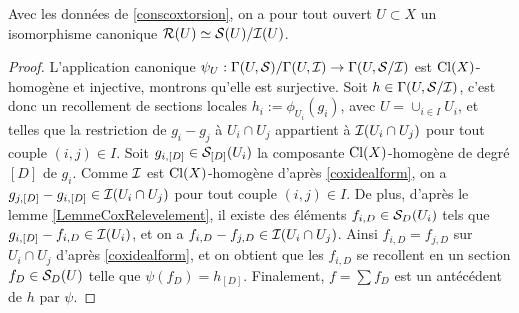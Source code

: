 \begin{prop}\label{coxsheafiso}
Avec les données de \ref{conscoxtorsion}, on a pour tout ouvert $U\subset X$ un isomorphisme canonique $\mathcal{R}(U)\simeq \mathcal{S}(U)/\mathcal{I}(U)$.
\end{prop}
\begin{proof}
L'application canonique $\psi_U:\Gamma(U,\mathcal{S})/\Gamma(U,\mathcal{I})\rightarrow\Gamma(U,\mathcal{S}/\mathcal{I})$ est $\operatorname{Cl}(X)$-homogène et injective, montrons qu'elle est surjective. Soit $h\in\Gamma(U,\mathcal{S}/\mathcal{I})$, c'est donc un recollement de sections locales $h_i:=\phi_{U_i}(g_i)$, avec $U=\cup_{i\in I}U_i$, et telles que la restriction de $g_i-g_j$ à $U_i\cap U_j$ appartient à $\mathcal{I}(U_i\cap U_j)$ pour tout couple $(i,j)\in I$. Soit $g_{i,[D]}\in \mathcal{S}_{[D]}(U_i)$ la composante $\operatorname{Cl}(X)$-homogène de degré $[D]$ de $g_i$. Comme $\mathcal{I}$ est $\operatorname{Cl}(X)$-homogène d'après \ref{coxidealform}, on a $g_{j,[D]}-g_{i,[D]}\in\mathcal{I}(U_i\cap U_j)$ pour tout couple $(i,j)\in I$. De plus, d'après le lemme \ref{LemmeCoxRelevelement}, il existe des éléments $f_{i,D}\in \mathcal{S}_D(U_i)$ tels que $g_{i,[D]}-f_{i,D}\in \mathcal{I}(U_i)$, et on a $f_{i,D}-f_{j,D}\in\mathcal{I}(U_i\cap U_j)$. Ainsi $f_{i,D}=f_{j,D}$ sur $U_i\cap U_j$ d'après \ref{coxidealform}, et on obtient que les $f_{i,D}$ se recollent en un section $f_D\in \mathcal{S}_D(U)$ telle que $\psi(f_D)=h_{[D]}$. Finalement, $f=\sum f_D$ est un antécédent de $h$ par $\psi$.
\end{proof}

